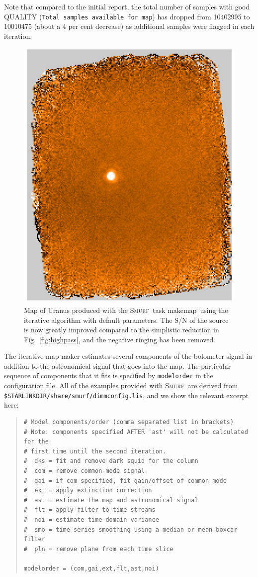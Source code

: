 \documentclass[twoside,11pt]{article}
\newcommand{\xref}[3]{#1}
\renewcommand{\_}{\texttt{\symbol{95}}}
\newenvironment{myquote}{\begin{quote}\begin{small}}{\end{small}\end{quote}}
\newcommand{\smurf}{\xref{\textsc{Smurf}}{sun258}{}}
\newcommand{\task}[1]{\textsf{#1}}
\newcommand{\makemap}{\xref{\task{makemap}}{sun258}{MAKEMAP}}
\begin{document}
Note that compared to the initial report, the total number of samples
with good QUALITY (\texttt{Total samples available for map}) has
dropped from 10402995 to 10010475 (about a 4 per cent decrease) as
additional samples were flagged in each iteration.

\begin{figure}
\begin{center}
\includegraphics[width=0.5\linewidth]{sc19_map_iterate}
\caption{Map of Uranus produced with the \smurf\ task \makemap\ using
  the iterative algorithm with default parameters. The S/N of the
  source is now greatly improved compared to the simplistic reduction
  in Fig.~\ref{fig:highpass}, and the negative ringing has been
  removed.}
\label{fig:itermap}
\end{center}
\end{figure}

The iterative map-maker estimates several components of the bolometer
signal in addition to the astronomical signal that goes into the
map. The particular sequence of components that it fits is specified
by \texttt{modelorder} in the configuration file. All of the examples
provided with \smurf\ are derived from
\texttt{\$STARLINK\_DIR/share/smurf/dimmconfig.lis}, and we show the
relevant excerpt here:

\begin{myquote}
\begin{verbatim}
# Model components/order (comma separated list in brackets)
# Note: components specified AFTER 'ast' will not be calculated for the
# first time until the second iteration.
#  dks = fit and remove dark squid for the column
#  com = remove common-mode signal
#  gai = if com specified, fit gain/offset of common mode
#  ext = apply extinction correction
#  ast = estimate the map and astronomical signal
#  flt = apply filter to time streams
#  noi = estimate time-domain variance
#  smo = time series smoothing using a median or mean boxcar filter
#  pln = remove plane from each time slice

modelorder = (com,gai,ext,flt,ast,noi)
\end{verbatim}
\end{myquote}
\end{document}
